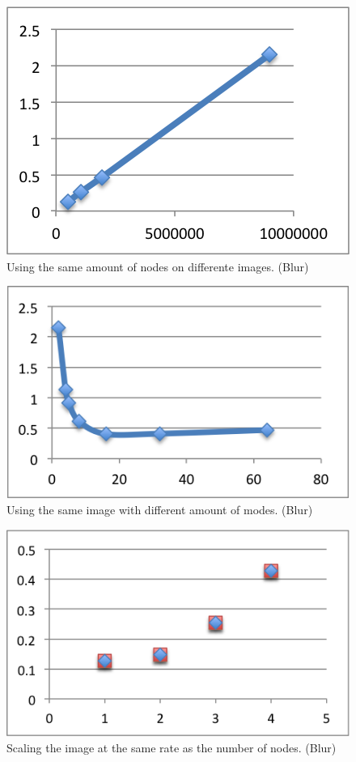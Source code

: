 \documentclass[a4paper]{article}
\begin{document}
\begin{figure}
  \centering
  \includegraphics{processorBlur.png}
  \caption{Using the same amount of nodes on differente images. (Blur)}
  \label{tab:fig4}
\end{figure}

\begin{figure}
  \centering
  \includegraphics{imageBlur.png}
  \caption{Using the same image with different amount of modes. (Blur)}
  \label{tab:fig5}
\end{figure}

\begin{figure}
  \centering
  \includegraphics{scaleBlur.png}
  \caption{Scaling the image at the same rate as the number of nodes. (Blur)}
  \label{tab:fig6}
\end{figure}
\end{document}
